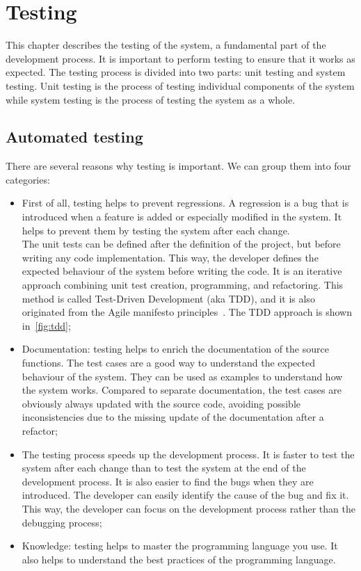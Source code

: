 \chapter{Testing}

This chapter describes the testing of the system, a fundamental part of the development process. It is important to perform testing to ensure that it works as expected. The testing process is divided into two parts: unit testing and system testing. Unit testing is the process of testing individual components of the system while system testing is the process of testing the system as a whole.

\section{Automated testing}


There are several reasons why testing is important. We can group them into four categories:

\begin{itemize}
  \item
        First of all, testing helps to prevent regressions. A regression is a bug that is introduced when a feature is added or especially modified in the system. It helps to prevent them by testing the system after each change. \\
        The unit tests can be defined after the definition of the project, but before writing any code implementation. This way, the developer defines the expected behaviour of the system before writing the code. It is an iterative approach combining unit test creation, programming, and refactoring. This method is called Test-Driven Development (aka TDD), and it is also originated from the Agile manifesto principles~\cite{agile-test-driven-development}. The TDD approach is shown in~\cref{fig:tdd};
  \item
        Documentation: testing helps to enrich the documentation of the source functions. The test cases are a good way to understand the expected behaviour of the system. They can be used as examples to understand how the system works. Compared to separate documentation, the test cases are obviously always updated with the source code, avoiding possible inconsistencies due to the missing update of the documentation after a refactor;
  \item
        The testing process speeds up the development process. It is faster to test the system after each change than to test the system at the end of the development process. It is also easier to find the bugs when they are introduced. The developer can easily identify the cause of the bug and fix it. This way, the developer can focus on the development process rather than the debugging process;
  \item
        Knowledge: testing helps to master the programming language you use. It also helps to understand the best practices of the programming language.
\end{itemize}

